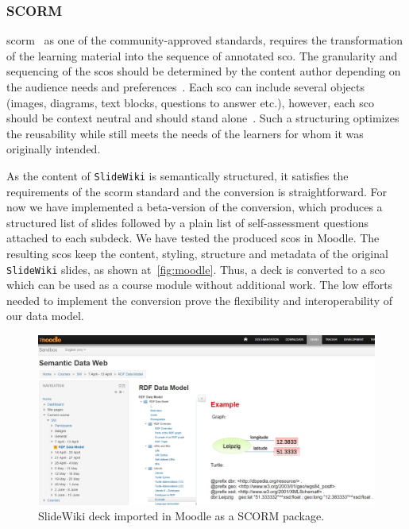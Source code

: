 \documentclass[PhD, Submit, ngerman,UKenglish,table]{scrbook}
\begin{document}
\subsubsection{SCORM}
\label{sec:SCORM_sub}

\gls{scorm}~\cite{scorm_specification2011} as one of the community-approved standards, requires the transformation of the learning material into the sequence of annotated \gls{sco}.
The granularity and sequencing of the \gls{sco}s should be determined by the content author depending on the audience needs and preferences~\cite{scorm2011}.
Each \gls{sco} can include several objects (images, diagrams, text blocks, questions to answer etc.), however, each \gls{sco} should be context neutral and should stand alone~\cite{Melon2004}.
Such a structuring optimizes the reusability while still meets the needs of the learners for whom it was originally intended.

As the content of \texttt{SlideWiki} is semantically structured, it satisfies the requirements of the \gls{scorm} standard and the conversion is straightforward.
For now we have implemented a beta-version of the conversion, which produces a structured list of slides followed by a plain list of self-assessment questions attached to each subdeck.
We have tested the produced \gls{sco}s in Moodle.
The resulting \gls{sco}s keep the content, styling, structure and metadata of the original \texttt{SlideWiki} slides, as shown at~\autoref{fig:moodle}.
Thus, a deck is converted to a \gls{sco} which can be used as a course module without additional work.
The low efforts needed to implement the conversion prove the flexibility and interoperability of our data model. 

\begin{figure}[!Ht]
	\centering
		\includegraphics[width=\textwidth]{Images/moodle.png}
	\caption{SlideWiki deck imported in Moodle as a SCORM package.}
	\label{fig:moodle}
\end{figure}
\end{document}
